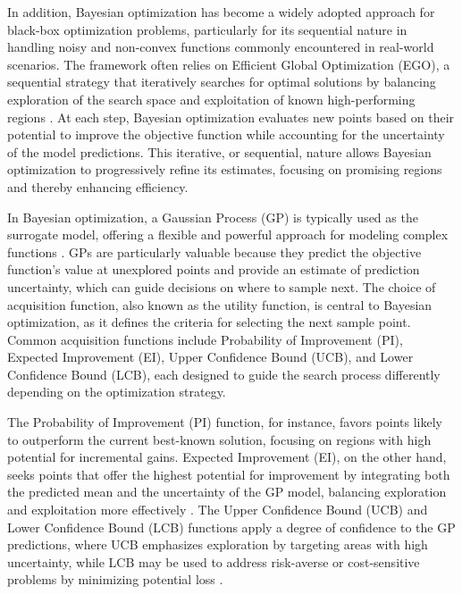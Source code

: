 In addition, Bayesian optimization has become a widely adopted approach for black-box optimization problems, particularly for its sequential nature in handling noisy and non-convex functions commonly encountered in real-world scenarios. The framework often relies on Efficient Global Optimization (EGO), a sequential strategy that iteratively searches for optimal solutions by balancing exploration of the search space and exploitation of known high-performing regions \parencite{jones1998efficient}. At each step, Bayesian optimization evaluates new points based on their potential to improve the objective function while accounting for the uncertainty of the model predictions. This iterative, or sequential, nature allows Bayesian optimization to progressively refine its estimates, focusing on promising regions and thereby enhancing efficiency.

In Bayesian optimization, a Gaussian Process (GP) is typically used as the surrogate model, offering a flexible and powerful approach for modeling complex functions \parencite{rasmussen2006gaussian}. GPs are particularly valuable because they predict the objective function's value at unexplored points and provide an estimate of prediction uncertainty, which can guide decisions on where to sample next. The choice of acquisition function, also known as the utility function, is central to Bayesian optimization, as it defines the criteria for selecting the next sample point. Common acquisition functions include Probability of Improvement (PI), Expected Improvement (EI), Upper Confidence Bound (UCB), and Lower Confidence Bound (LCB), each designed to guide the search process differently depending on the optimization strategy.

The Probability of Improvement (PI) function, for instance, favors points likely to outperform the current best-known solution, focusing on regions with high potential for incremental gains. Expected Improvement (EI), on the other hand, seeks points that offer the highest potential for improvement by integrating both the predicted mean and the uncertainty of the GP model, balancing exploration and exploitation more effectively \parencite{mockus1994application}. The Upper Confidence Bound (UCB) and Lower Confidence Bound (LCB) functions apply a degree of confidence to the GP predictions, where UCB emphasizes exploration by targeting areas with high uncertainty, while LCB may be used to address risk-averse or cost-sensitive problems by minimizing potential loss \parencite{srinivas2009gaussian}.


